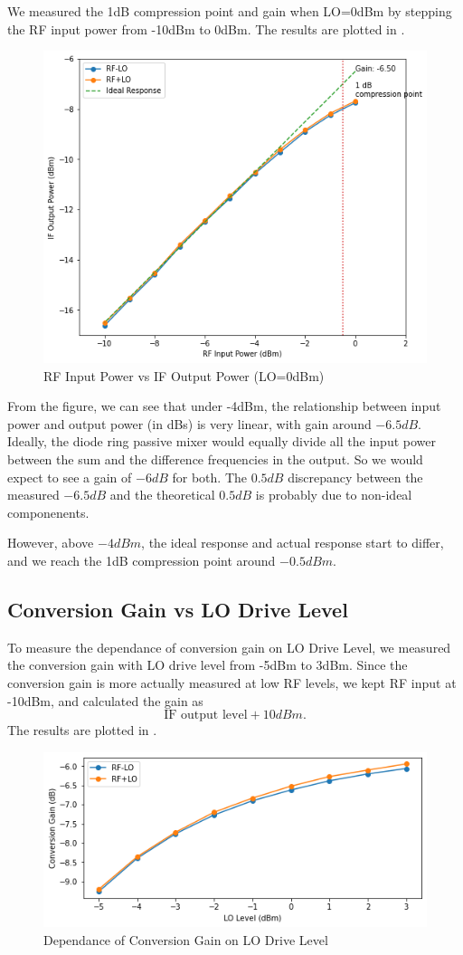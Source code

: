 \documentclass{article}
\begin{document}
We measured the 1dB compression point and gain when LO=0dBm by stepping the RF input power from -10dBm to 0dBm.
The results are plotted in .

\begin{figure}[h]
    \centering
    \includegraphics[width=0.5\linewidth]{./pics/1db_compression.png}
    \caption{RF Input Power vs IF Output Power (LO=0dBm)}
    \label{fig:rf_if}
\end{figure}

From the figure, we can see that under -4dBm, the relationship between input power and output power (in dBs) is very linear, with gain around $-6.5dB$.
Ideally, the diode ring passive mixer would equally divide all the input power between the sum and the difference frequencies in the output.
So we would expect to see a gain of $-6dB$ for both.
The $0.5dB$ discrepancy between the measured $-6.5dB$ and the theoretical $0.5dB$ is probably due to non-ideal componenents.

However, above $-4dBm$, the ideal response and actual response start to differ, and we reach the 1dB compression point around $-0.5dBm$.

\subsection{Conversion Gain vs LO Drive Level}
To measure the dependance of conversion gain on LO Drive Level, we measured the conversion gain with LO drive level from -5dBm to 3dBm.
Since the conversion gain is more actually measured at low RF levels, we kept RF input at -10dBm, and calculated the gain as
\[ \text{IF output level} + 10dBm.
\]
The results are plotted in .

\begin{figure}[h]
    \centering
    \includegraphics[width=.5\linewidth]{./pics/lo_gain.png}
    \caption{Dependance of Conversion Gain on LO Drive Level}
    \label{fig:lo_gain}
\end{figure}
\end{document}
